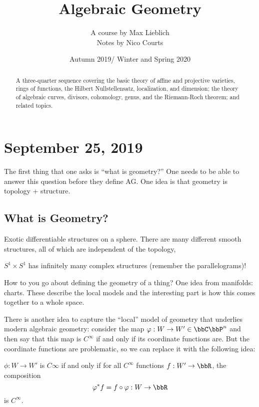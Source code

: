 \documentclass[12pt]{article}
\begin{document}
\title{Algebraic Geometry\vspace{-1ex}}
\author{A course by Max Lieblich\\
Notes by Nico Courts}
\date{Autumn 2019/ Winter and Spring 2020}
\maketitle

\begin{abstract}
	A three-quarter sequence covering the basic theory of affine and projective 
	varieties, rings of functions, the Hilbert Nullstellensatz, localization, and 
	dimension; the theory of algebraic curves, divisors, cohomology, genus, and the 
	Riemann-Roch theorem; and related topics. 
\end{abstract}

\section{September 25, 2019}
The first thing that one asks is ``what is geometry?'' One needs to be able to answer this 
question before they define AG. One idea is that geometry is topology + structure.

\subsection{What is Geometry?}

\begin{ex}
	Exotic differentiable structures on a sphere. There are many different smooth structures,
	all of which are independent of the topology,

	$S^1\times S^1$ has infinitely many complex structures (remember the parallelograms)!
\end{ex}

How to you go about defining the geometry of a thing? One idea from manifolds: charts. These 
describe the local models and the interesting part is how this comes together to a whole space.

There is another idea to capture the ``local'' model of geometry that underlies modern algebraic geometry:
consider the map $\varphi:W\to W'\in\bbC\bbP^n$ and then say that this map is $C^\infty$ if and only if its coordinate
functions are. But the coordinate functions are problematic, so we can replace it with the following idea:

$\phi:W\to W'$ is $C\infty$ if and only if for all $C^\infty$ functions $f:W'\to \bbR$,
the composition
\[\varphi^\ast f=f\circ \varphi:W\to \bbR\]
is $C^\infty$.
\end{document}
